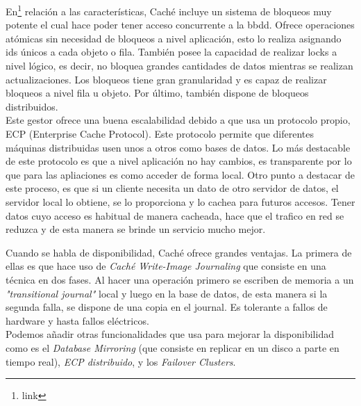\documentclass{article}
\begin{document}
En\footnote{link} relación a las características, Caché incluye un sistema de bloqueos muy potente el cual hace poder tener acceso concurrente a la bbdd. Ofrece operaciones atómicas sin necesidad de bloqueos a nivel aplicación, esto lo realiza asignando ids únicos a cada objeto o fila. También posee la capacidad de realizar locks a nivel lógico, es decir, no bloquea grandes cantidades de datos mientras se realizan actualizaciones. Los bloqueos tiene gran granularidad y es capaz de realizar bloqueos a nivel fila u objeto. Por último, también dispone de bloqueos distribuidos.\\

Este gestor ofrece una buena escalabilidad debido a que usa un protocolo propio, ECP (Enterprise Cache Protocol). Este protocolo permite que diferentes máquinas distribuidas usen unos a otros como bases de datos. Lo más destacable de este protocolo es que a nivel aplicación no hay cambios, es transparente por lo que para las apliaciones es como acceder de forma local. Otro punto a destacar de este proceso, es que si un cliente necesita un dato de otro servidor de datos, el servidor local lo obtiene, se lo proporciona y lo cachea para futuros accesos. Tener datos cuyo acceso es habitual de manera cacheada, hace que el trafico en red se reduzca y de esta manera se brinde un servicio mucho mejor.

Cuando  se habla de disponibilidad, Caché ofrece grandes ventajas. La primera de ellas es que hace uso de \textit{Caché Write-Image Journaling} que consiste en una técnica en dos fases. Al hacer una operación primero se escriben de memoria a un \textit{"transitional journal"} local  y luego en la base de datos, de esta manera si la segunda falla, se dispone de una copia en el journal. Es tolerante a fallos de hardware y hasta fallos eléctricos. \\
Podemos añadir otras funcionalidades que usa para mejorar la disponibilidad como es el \textit{Database Mirroring} (que consiste en replicar en un disco a parte en tiempo real), \textit{ECP distribuido}, y los \textit{Failover Clusters}.










\newpage


\end{document}
